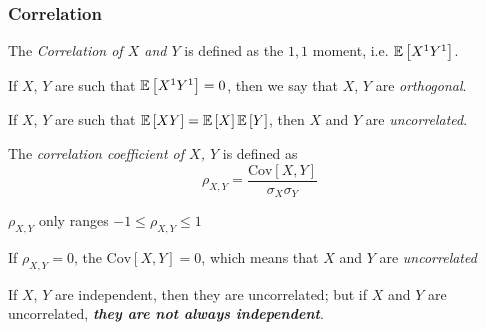 		\subsubsection{Correlation} \label{subsubsec:Correlation}
			\begin{definition}[Correlation] \label{def:Correlation}
				The \emph{Correlation of $X$ and $Y$} is defined as the $1,1$ moment, i.e. $\operatorname{\mathbb{E}} \left[ X^{1} Y^{1} \right]$.
				\begin{remark}
					If $X$, $Y$ are such that $\operatorname{\mathbb{E}} \left[ X^{1} Y^{1} \right] = 0$, then we say that $X$, $Y$ are \emph{orthogonal}.
				\end{remark}
				\begin{remark}
					If $X$, $Y$ are such that $\operatorname{\mathbb{E}} \left[ XY \right] = \operatorname{\mathbb{E}} \left[ X \right] \operatorname{\mathbb{E}} \left[ Y \right]$, then $X$ and $Y$ are \emph{uncorrelated}.
				\end{remark}
			\end{definition}
			\begin{definition} \label{def:Correlation Coefficient}
				The \emph{correlation coefficient of $X$, $Y$} is defined as
				\begin{equation} \label{eq:Correlation Coefficient}
				\rho_{X,Y} = \frac{\text{Cov} \left[ X,Y \right]}{\sigma_{X} \sigma_{Y}}
				\end{equation}
				\begin{remark}
					$\rho_{X,Y}$ only ranges $-1 \leq \rho_{X,Y} \leq 1$
				\end{remark}
				\begin{remark}
					If $\rho_{X,Y} = 0$, the $\text{Cov}\left[ X,Y \right] = 0$, which means that $X$ and $Y$ are \emph{uncorrelated}
				\end{remark}
				\begin{remark}
					If $X$, $Y$ are independent, then they are uncorrelated; but if $X$ and $Y$ are uncorrelated, \emph{\textbf{they are not always independent}}.
				\end{remark}
			\end{definition}